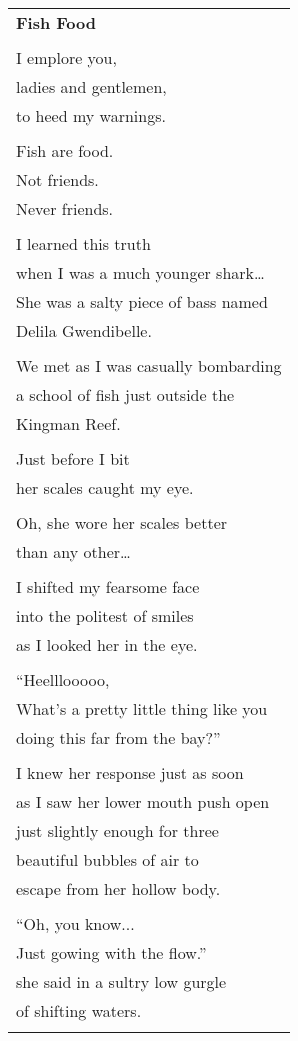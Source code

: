\documentclass{article}
\begin{document}
\begin{center}
\begin{tabular}{l}
\textbf{Fish Food} \\
\\
I emplore you, \\
ladies and gentlemen, \\
to heed my warnings. \\
\\
Fish are food. \\
Not friends. \\
Never friends. \\
\\
I learned this truth \\
when I was a much younger shark\ldots{} \\
She was a salty piece of bass named \\
Delila Gwendibelle. \\
\\
We met as I was casually bombarding \\
a school of fish just outside the \\
Kingman Reef. \\ %
\\
Just before I bit \\
her scales caught my eye. \\
\\
Oh, she wore her scales better \\
than any other\ldots{} \\
\\
I shifted my fearsome face \\
into the politest of smiles \\
as I looked her in the eye. \\
\\
``Heelllooooo, \\
What's a pretty little thing like you \\
doing this far from the bay?'' \\
\\
I knew her response just as soon \\
as I saw her lower mouth push open \\
just slightly enough for three \\
beautiful bubbles of air to \\
escape from her hollow body. \\
\\
``Oh, you know... \\
Just gowing with the flow.'' \\
she said in a sultry low gurgle \\
of shifting waters. \\
\\
\end{tabular}
\end{center}
\end{document}

